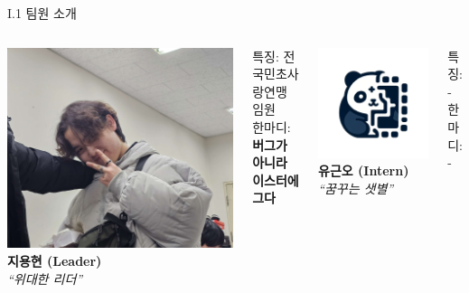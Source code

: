 \documentclass{beamer}
\begin{document}
\begin{frame}{I.1 팀원 소개}
	\begin{columns}[T,onlytextwidth]
		\centering
		\includegraphics[width=.5\linewidth,height=.35\textheight]{ji.jpg}\\
		\textbf{지용현 (Leader)}\\
		\textit{``위대한 리더''}\\
		\begin{flushleft}\footnotesize
			특징: 전국민초사랑연맹 임원\\
			한마디: \textbf{버그가 아니라 이스터에그다}
		\end{flushleft}
		
		\centering
		\includegraphics[width=.5\linewidth,height=.35\textheight]{PANDA_logo.png}\\
		\textbf{유근오 (Intern)}\\
		\textit{``꿈꾸는 샛별''}\\
		\begin{flushleft}\footnotesize
			특징: -\\
			한마디: -
		\end{flushleft}
	\end{columns}
\end{frame}
\end{document}
